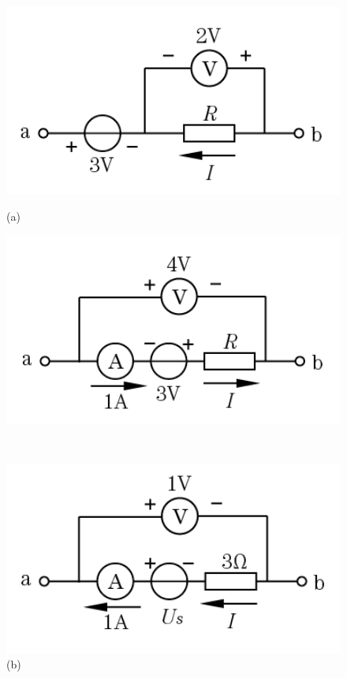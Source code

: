 \documentclass[hyperref, UTF8]{ctexart}
\begin{document}
\begin{figure}[!htb]
  \centering
  \begin{minipage}[t]{0.256\textwidth}
    \centering
    \includegraphics[width=1\textwidth]{p1-9-a.png}
    \caption*{(a)}
  \end{minipage}
  \begin{minipage}[t]{0.257\textwidth}
    \centering
    \includegraphics[width=1\textwidth]{p1-9-b.png}
    \caption*{(b)}
  \end{minipage} \\
  \centering
  \begin{minipage}[t]{0.254\textwidth}
    \centering
    \includegraphics[width=1\textwidth]{p1-9-c.png}

\end{minipage}
\end{figure}
\end{document}
